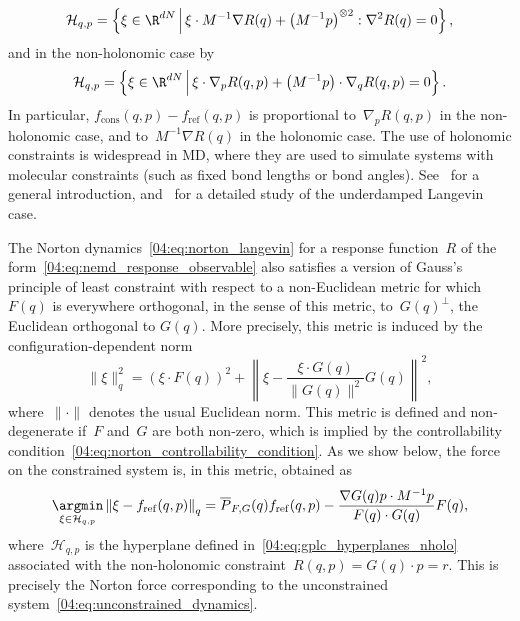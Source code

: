 \begin{equation}
\label{04:eq:gplc_hyperplanes_holo}
\mathcal H_{q,p}=\left\{\xi \in \R^{dN}\,\middle|\,\xi\cdot M^{-1}\nabla R(q) + \left(M^{-1}p\right)^{\otimes 2}:\nabla^2 R(q)=0\right\},
\end{equation}
and in the non-holonomic case by
\begin{equation}
    \label{04:eq:gplc_hyperplanes_nholo}
    \mathcal H_{q,p}=\left\{\xi\in \R^{dN}\,\middle|\, \xi\cdot \nabla_p R(q,p)+\left(M^{-1}p\right)\cdot \nabla_q R(q,p)=0\right\}.
\end{equation}
In particular, $f_{\mathrm{cons}}(q,p)-f_{\mathrm{ref}}(q,p)$ is proportional to~$\nabla_p R(q,p)$ in the non-holonomic case, and to~$M^{-1}\nabla R(q)$ in the holonomic case. The use of holonomic constraints is widespread in MD, where they are used to simulate systems with molecular constraints (such as fixed bond lengths or bond angles). See~\cite[Chapter 4]{LM15} for a general introduction, and~\cite{LRS12} for a detailed study of the underdamped Langevin case.

The Norton dynamics~\eqref{04:eq:norton_langevin} for a response function~$R$ of the form~\eqref{04:eq:nemd_response_observable} also satisfies a version of Gauss's principle of least constraint with respect to a non-Euclidean metric for which~$F(q)$ is everywhere orthogonal, in the sense of this metric, to~$G(q)^{\perp}$, the Euclidean orthogonal to $G(q)$.
More precisely, this metric is induced by the configuration-dependent norm
\begin{equation}
    \label{04:eq:q_metric}
    \|\xi\|^2_q = \left(\xi\cdot F(q)\right)^2 + \left\|\xi-\frac{\xi\cdot G(q)}{\|G(q)\|^2}G(q)\right\|^2,
\end{equation}
where~$\|\cdot\|$ denotes the usual Euclidean norm. This metric is defined and non-degenerate if~$F$ and~$G$ are both non-zero, which is implied by the controllability condition~\eqref{04:eq:norton_controllability_condition}. As we show below, the force on the constrained system is, in this metric, obtained as
\begin{equation}
    \label{04:eq:variational_problem}
    \underset{\xi\in \mathcal{H}_{q,p}}{\argmin} \left\| \xi- f_{\mathrm{ref}}(q,p)\right\|_q = \overline{P}_{F,G}(q) f_{\mathrm{ref}}(q,p) - \frac{\nabla G(q) p\cdot M^{-1}p}{F(q)\cdot G(q)}F(q),
\end{equation}
where~$\mathcal{H}_{q,p}$ is the hyperplane defined in~\eqref{04:eq:gplc_hyperplanes_nholo} associated with the non-holonomic constraint~$R(q,p)=G(q)\cdot p=r$. This is precisely the Norton force corresponding to the unconstrained system~\eqref{04:eq:unconstrained_dynamics}.


